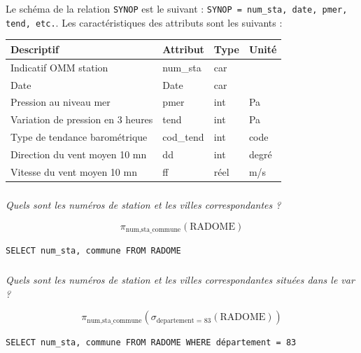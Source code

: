 \documentclass[10pt,fleqn]{article} %
\begin{document}
Le schéma de la relation \texttt{SYNOP} est le suivant : \texttt{SYNOP = {num\_sta, date, pmer, tend, etc.}}. Les caractéristiques des attributs sont les suivants :
\begin{center}
\begin{tabular}{llll}
\hline
Descriptif&	Attribut&	Type&	 Unité\\
\hline
\hline
Indicatif OMM station&	num\_sta& car&	\\
Date&	Date	&car&	\\
Pression au niveau mer&	pmer&	int&	Pa\\
Variation de pression en 3 heures&	tend&	int&	Pa\\
Type de tendance barométrique&	cod\_tend&	int&	code\\
Direction du vent moyen 10 mn&	dd&	 int&	degré\\
Vitesse du vent moyen 10 mn&	ff&	réel& 	m/s \\
\hline
\end{tabular}
\end{center}

\subparagraph{}
\textit{Quels sont les numéros de station et les villes correspondantes ? }
\ifprof
\begin{corrige}
$$ \pi_{\text{num},\text{sta\_commune}}\left( \text{RADOME} \right) $$

\begin{center}
\texttt{SELECT num\_sta, commune FROM RADOME}
\end{center}
\end{corrige}
\else
\fi

\subparagraph{}
\textit{Quels sont les numéros de station et les villes correspondantes situées dans le var ? }
\ifprof
\begin{corrige}
$$ \pi_{\text{num},\text{sta\_commune}}\left(\sigma_{\text{departement = 83}} \left(\text{RADOME} \right)\right) $$

\begin{center}
\texttt{SELECT num\_sta, commune FROM RADOME WHERE département = 83}
\end{center}
\end{corrige}
\else
\fi
\end{document}
